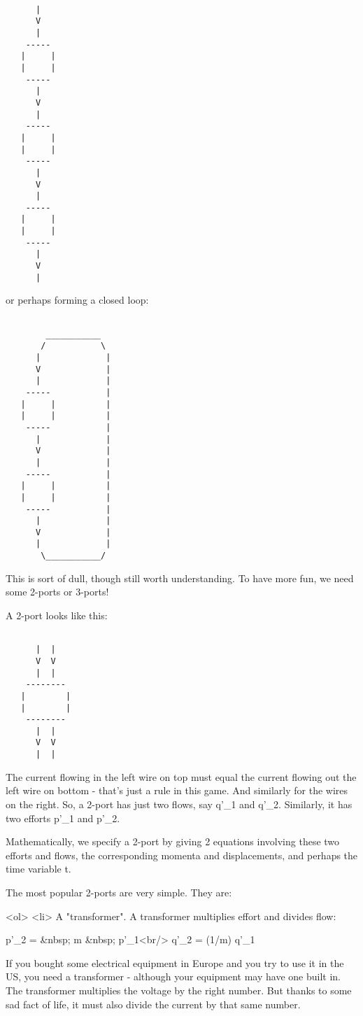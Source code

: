 \begin{verbatim}

      |
      V
      |
    -----
   |     |
   |     |
    -----
      |
      V
      |
    -----
   |     |
   |     |
    -----
      |
      V
      |
    -----
   |     |
   |     |
    -----
      |
      V
      |
\end{verbatim}
    

or perhaps forming a closed loop:


\begin{verbatim}

        ___________
       /           \
      |             |
      V             |
      |             |
    -----           |
   |     |          |
   |     |          |
    -----           |
      |             |
      V             |
      |             |
    -----           |
   |     |          |
   |     |          |
    -----           |
      |             |
      V             |
      |             |
       \___________/

\end{verbatim}
    

This is sort of dull, though still worth understanding.  To have more
fun, we need some 2-ports or 3-ports!

A 2-port looks like this:


\begin{verbatim}

      |  |
      V  V
      |  |
    --------
   |        |
   |        |
    --------
      |  |
      V  V
      |  |
\end{verbatim}
    

The current flowing in the left wire on top must equal the current
flowing out the left wire on bottom - that's just a rule in this game.
And similarly for the wires on the right.  So, a 2-port has just two
flows, say q'_{1} and q'_{2}.  Similarly, it has two
efforts p'_{1} and p'_{2}.

Mathematically, we specify a 2-port by giving 2 equations involving 
these two efforts and flows, the corresponding momenta and 
displacements, and perhaps the time variable t.

The most popular 2-ports are very simple.  They are:

<ol>
<li>
A "transformer".  A transformer multiplies effort and divides
  flow:

  p'_{2} =  &nbsp; m &nbsp;  p'_{1}<br/>
  q'_{2} = (1/m) q'_{1}

 If you bought some electrical equipment in Europe and you try to
 use it in the US, you need a transformer - although your equipment 
 may have one built in.  The transformer multiplies the voltage
 by the right number.  But thanks to some sad fact of life, it must
 also divide the current by that same number.  

